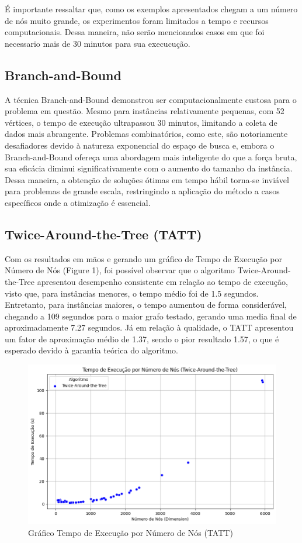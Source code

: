 \documentclass[12pt]{article}
\begin{document}
É importante ressaltar que, como os exemplos apresentados chegam a um número de nós muito grande, os experimentos foram limitados a tempo e recursos computacionais. Dessa maneira, não serão mencionados casos em que foi necessario mais de 30 minutos para sua execucução.

\subsection{Branch-and-Bound}
A técnica Branch-and-Bound demonstrou ser computacionalmente custosa para o problema em questão. Mesmo para instâncias relativamente pequenas, com 52 vértices, o tempo de execução ultrapassou 30 minutos, limitando a coleta de dados mais abrangente.
Problemas combinatórios, como este, são notoriamente desafiadores devido à natureza exponencial do espaço de busca e, embora o Branch-and-Bound ofereça uma abordagem mais inteligente do que a força bruta, sua eficácia diminui significativamente com o aumento do tamanho da instância. Dessa maneira, a obtenção de soluções ótimas em tempo hábil torna-se inviável para problemas de grande escala, restringindo a aplicação do método a casos específicos onde a otimização é essencial.

\subsection{Twice-Around-the-Tree (TATT)}
Com os resultados em mãos e gerando um gráfico de Tempo de Execução por Número de Nós (Figure 1), foi possível observar que o algoritmo Twice-Around-the-Tree apresentou desempenho consistente em relação ao tempo de execução, visto que, para instâncias menores, o tempo médio foi de 1.5 segundos. Entretanto, para instâncias maiores, o tempo aumentou de forma considerável, chegando a 109 segundos para o maior grafo testado, gerando uma media final de aproximadamente 7.27 segundos. Já em relação à qualidade, o TATT apresentou um fator de aproximação médio de 1.37, sendo o pior resultado 1.57, o que é esperado devido à garantia teórica do algoritmo.

\begin{figure}[ht]
\centering
\includegraphics[width=.7\textwidth]{Figure1.png}
\caption{Gráfico Tempo de Execução por Número de Nós (TATT)}
\label{fig:exampleFig1}
\end{figure}
\end{document}
